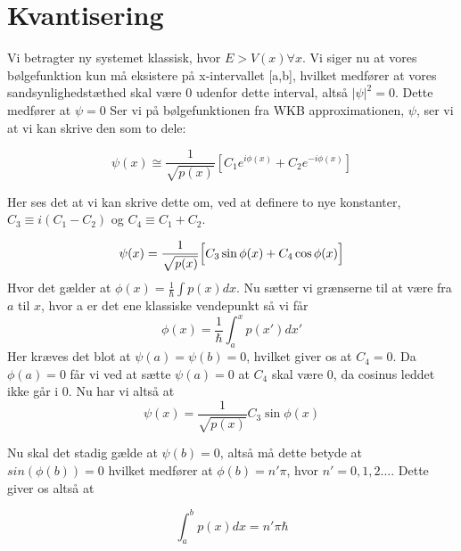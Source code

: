 \section{Kvantisering}
Vi betragter ny systemet klassisk, hvor $E > V(x) \forall x$. Vi siger nu at vores bølgefunktion kun må eksistere på x-intervallet [a,b], hvilket medfører at vores sandsynlighedstæthed skal være 0 udenfor dette interval, altså $|\psi|^2 = 0$. Dette medfører at $\psi = 0$
Ser vi på bølgefunktionen fra WKB approximationen, $\psi$, ser vi at vi kan skrive den som to dele:

\begin{equation}
  \psi(x) \cong \frac{1}{\sqrt{p(x)}}\left[C_1e^{i\phi(x)}+C_2e^{-i\phi(x)}\right]
  \label{eq:kvantiseringStart}
\end{equation}

Her ses det at vi kan skrive dette om, ved at definere to nye konstanter, $C_3 \equiv i(C_1-C_2)$ og $C_4 \equiv C_1+C_2$.


\begin{equation}
  \psi(x) = \frac{1}{\sqrt{p(x)}}
  \Bigl[    C_3\sin{\phi(x)}+C_4\cos{\phi(x)}   \Bigr]
  \label{eq:kvantiseringSinCos}
\end{equation}
Hvor det gælder at $\phi(x) = \frac{1}{\hbar}\int p(x) dx$. Nu sætter vi grænserne til at være fra $a$ til $x$, hvor a er det ene klassiske vendepunkt så vi får
\begin{equation}
  \phi(x) = \frac{1}{\hbar}\int_{a}^{x} p(x')dx'
\end{equation}
Her kræves det blot at $\psi(a) = \psi(b) = 0$, hvilket giver os at $C_4 = 0$. Da $\phi(a) = 0$ får vi ved at sætte $\psi(a) = 0$ at $C_4$ skal være 0, da cosinus leddet ikke går i 0.
Nu har vi altså at
\begin{equation}
  \psi(x) = \frac{1}{\sqrt{p(x)}}C_3\sin{\phi(x)}
\end{equation}

Nu skal det stadig gælde at $\psi(b) = 0$, altså må dette betyde at $sin(\phi(b)) = 0$ hvilket medfører at $\phi(b) = n'\pi$, hvor $n' = 0,1,2...$.
Dette giver os altså at

\begin{equation}
  \int_{a}^{b} p(x) dx = n'\pi\hbar
  \label{eq:kvantiDone}
\end{equation}
